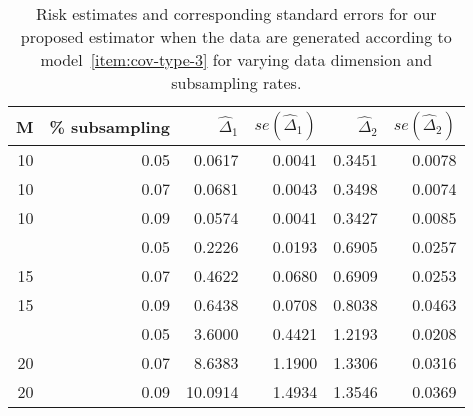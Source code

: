 \documentclass[12pt]{article}
\theoremstyle{definition}
\begin{document}
\begin{table}[H]
\centering
\begin{tabular}{rrrrrr}
  \hline
M & \% subsampling & $\hat{\Delta}_1$ & $se\left( \hat{\Delta}_1\right)$& $\hat{\Delta}_2$ & $se\left( \hat{\Delta}_2\right)$ \\ 
  \hline
10 & 0.05 & 0.0617 & 0.0041 & 0.3451 & 0.0078 \\ 
  10 & 0.07 & 0.0681 & 0.0043 & 0.3498 & 0.0074 \\ 
  10 & 0.09 & 0.0574 & 0.0041 & 0.3427 & 0.0085 \\ 
    \hdashline
  15 & 0.05 & 0.2226 & 0.0193 & 0.6905 & 0.0257 \\ 
  15 & 0.07 & 0.4622 & 0.0680 & 0.6909 & 0.0253 \\ 
  15 & 0.09 & 0.6438 & 0.0708 & 0.8038 & 0.0463 \\ 
    \hdashline
  20 & 0.05 & 3.6000 & 0.4421 & 1.2193 & 0.0208 \\ 
  20 & 0.07 & 8.6383 & 1.1900 & 1.3306 & 0.0316 \\ 
  20 & 0.09 & 10.0914 & 1.4934 & 1.3546 & 0.0369 \\ 
   \hline
\end{tabular}
\caption{Risk estimates and corresponding standard errors for our proposed estimator when the data are generated according to model~\ref{item:cov-type-3} for varying data dimension and subsampling rates.} 
\end{table}

\end{document}
